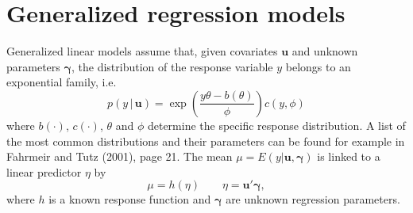 \documentclass[11pt,a4paper,twoside]{bayesxarticle}
\def \gammavec {\boldsymbol{\gamma}}
\def \uvec {\mathbf{u}}
\begin{document}
\section{Generalized regression models}
\label{obsmodel}

Generalized linear models assume that, given covariates $\uvec$ and
unknown parameters $\gammavec$, the distribution of the response
variable $y$ belongs to an exponential family, i.e.
\begin{equation}
\label{likel} p(y \, | \, \uvec) = \exp \left( \frac{y \theta -
b(\theta)}{\phi} \right) c(y,\phi)
\end{equation}
where $b(\cdot)$, $c(\cdot)$, $\theta$ and $\phi$ determine the
specific response distribution. A list of the most common
distributions and their parameters can be found for example in
Fahrmeir and Tutz (2001), page 21. The mean $\mu=E(y|\uvec,\gammavec)$ is
linked to a linear predictor $\eta$ by
\begin{equation}
\label{glm} \mu=h(\eta) \qquad \eta= \uvec'\gammavec,
\end{equation}
where $h$ is a known response function and $\gammavec$ are unknown
regression parameters.
\end{document}
